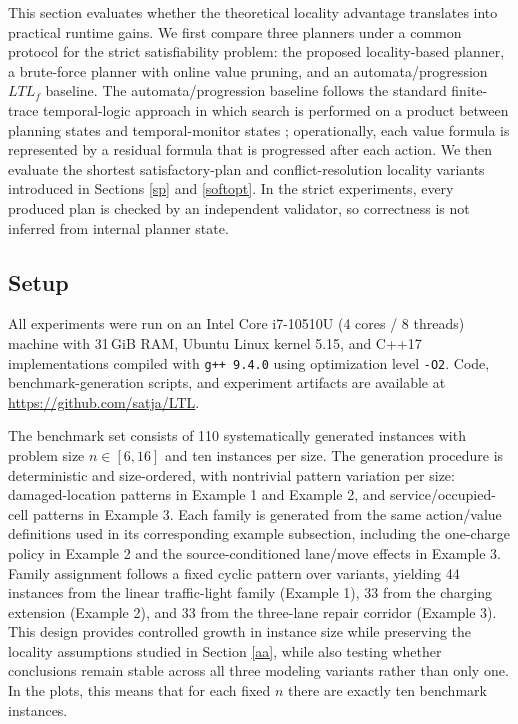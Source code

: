 \documentclass[a4paper,fleqn]{cas-dc}
\begin{document}
This section evaluates whether the theoretical locality advantage translates into practical runtime gains. We first compare three planners under a common protocol for the strict satisfiability problem: the proposed locality-based planner, a brute-force planner with online value pruning, and an automata/progression $LTL_f$ baseline. The automata/progression baseline follows the standard finite-trace temporal-logic approach in which search is performed on a product between planning states and temporal-monitor states \cite{degiacomo2013ltlf,camacho2018finite}; operationally, each value formula is represented by a residual formula that is progressed after each action. We then evaluate the shortest satisfactory-plan and conflict-resolution locality variants introduced in Sections \ref{sp} and \ref{softopt}. In the strict experiments, every produced plan is checked by an independent validator, so correctness is not inferred from internal planner state.

\subsection{Setup}

All experiments were run on an Intel Core i7-10510U (4 cores / 8 threads) machine with 31\,GiB RAM, Ubuntu Linux kernel 5.15, and C++17 implementations compiled with \texttt{g++ 9.4.0} using optimization level \texttt{-O2}.
Code, benchmark-generation scripts, and experiment artifacts are available at \url{https://github.com/satja/LTL}.

The benchmark set consists of 110 systematically generated instances with problem size $n\in[6,16]$ and ten instances per size. The generation procedure is deterministic and size-ordered, with nontrivial pattern variation per size: damaged-location patterns in Example 1 and Example 2, and service/occupied-cell patterns in Example 3. Each family is generated from the same action/value definitions used in its corresponding example subsection, including the one-charge policy in Example 2 and the source-conditioned lane/move effects in Example 3. Family assignment follows a fixed cyclic pattern over variants, yielding 44 instances from the linear traffic-light family (Example 1), 33 from the charging extension (Example 2), and 33 from the three-lane repair corridor (Example 3). This design provides controlled growth in instance size while preserving the locality assumptions studied in Section \ref{aa}, while also testing whether conclusions remain stable across all three modeling variants rather than only one. In the plots, this means that for each fixed $n$ there are exactly ten benchmark instances.
\end{document}
